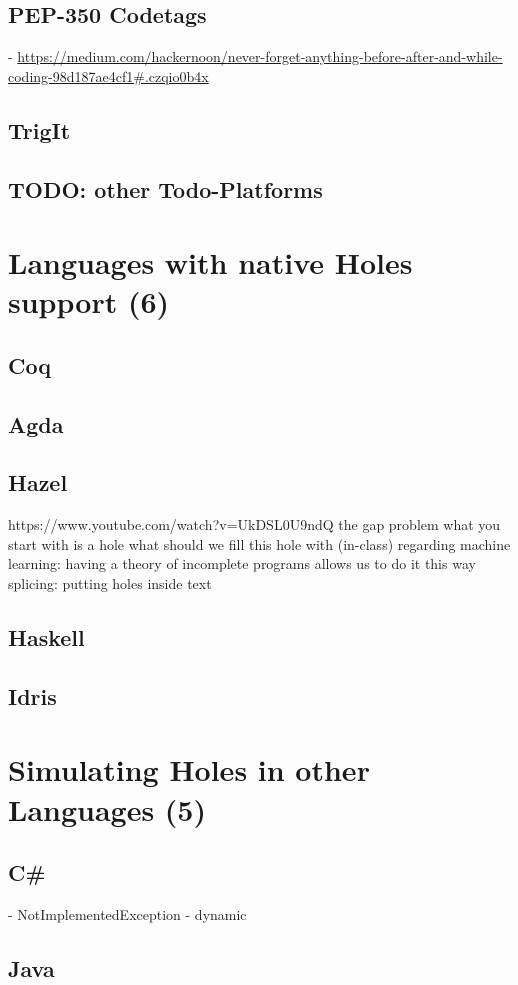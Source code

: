 \documentclass[master,english,smartquotes]{hgbthesis}
\begin{document}
\subsection{PEP-350 Codetags}
- \url{https://medium.com/hackernoon/never-forget-anything-before-after-and-while-coding-98d187ae4cf1#.czqio0b4x}
\subsection{TrigIt}
\subsection{TODO: other Todo-Platforms}
\section{Languages with native Holes support (6)}
\subsection{Coq}
\subsection{Agda}
\subsection{Hazel}
https://www.youtube.com/watch?v=UkDSL0U9ndQ
the gap problem
what you start with is a hole
what should we fill this hole with (in-class)
regarding machine learning: having a theory of incomplete programs allows us to do it this way
splicing: putting holes inside text
\subsection{Haskell}
\subsection{Idris}
\section{Simulating Holes in other Languages (5)}
\subsection{C\#}
- NotImplementedException
- dynamic
\subsection{Java}
\end{document}

